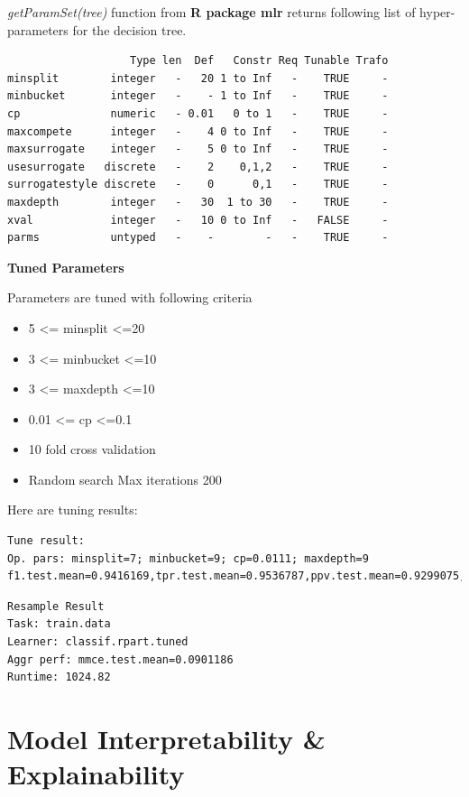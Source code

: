 \documentclass[
]{article}
\providecommand{\tightlist}{%
  \setlength{\itemsep}{0pt}\setlength{\parskip}{0pt}}
\begin{document}
\emph{getParamSet(tree)} function from \textbf{R package mlr} returns
following list of hyper-parameters for the decision tree.

\begin{verbatim}
                   Type len  Def   Constr Req Tunable Trafo
minsplit        integer   -   20 1 to Inf   -    TRUE     -
minbucket       integer   -    - 1 to Inf   -    TRUE     -
cp              numeric   - 0.01   0 to 1   -    TRUE     -
maxcompete      integer   -    4 0 to Inf   -    TRUE     -
maxsurrogate    integer   -    5 0 to Inf   -    TRUE     -
usesurrogate   discrete   -    2    0,1,2   -    TRUE     -
surrogatestyle discrete   -    0      0,1   -    TRUE     -
maxdepth        integer   -   30  1 to 30   -    TRUE     -
xval            integer   -   10 0 to Inf   -   FALSE     -
parms           untyped   -    -        -   -    TRUE     -
\end{verbatim}

\textbf{Tuned Parameters}

Parameters are tuned with following criteria

\begin{itemize}
\tightlist
\item
  5 \textless= minsplit \textless=20
\item
  3 \textless= minbucket \textless=10
\item
  3 \textless= maxdepth \textless=10
\item
  0.01 \textless= cp \textless=0.1
\item
  10 fold cross validation
\item
  Random search Max iterations 200
\end{itemize}

Here are tuning results:

\begin{verbatim}
Tune result:
Op. pars: minsplit=7; minbucket=9; cp=0.0111; maxdepth=9
f1.test.mean=0.9416169,tpr.test.mean=0.9536787,ppv.test.mean=0.9299075,tnr.test.mean=0.7904280
\end{verbatim}

\begin{verbatim}
Resample Result
Task: train.data
Learner: classif.rpart.tuned
Aggr perf: mmce.test.mean=0.0901186
Runtime: 1024.82
\end{verbatim}

\newpage

\hypertarget{model-interpretability-explainability}{%
\section{Model Interpretability \&
Explainability}\label{model-interpretability-explainability}}
\end{document}
